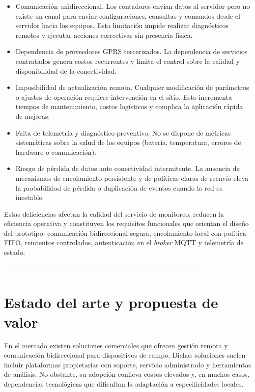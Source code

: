 \begin{itemize}
\item  Comunicación unidireccional. Los contadores envían datos al servidor pero no existe un canal para enviar configuraciones, consultas y comandos desde el servidor hacia los equipos. Esta limitación impide realizar diagnósticos remotos y ejecutar acciones correctivas sin presencia física.

\item  Dependencia de proveedores GPRS tercerizados. La dependencia de servicios contratados genera costos recurrentes y limita el control sobre la calidad y disponibilidad de la conectividad.

\item  Imposibilidad de actualización remota. Cualquier modificación de parámetros o ajustes de operación requiere intervención en el sitio. Esto incrementa tiempos de mantenimiento, costos logísticos y complica la aplicación rápida de mejoras.

\item  Falta de telemetría y diagnóstico preventivo. No se dispone de métricas sistemáticas sobre la salud de los equipos (batería, temperatura, errores de hardware o comunicación).

\item Riesgo de pérdida de datos ante conectividad intermitente. La ausencia de mecanismos de encolamiento persistente y de políticas claras de reenvío eleva la probabilidad de pérdida o duplicación de eventos cuando la red es inestable.

\end{itemize}

Estas deficiencias afectan la calidad del servicio de monitoreo, reducen la eficiencia operativa y constituyen los requisitos funcionales que orientan el diseño del prototipo: comunicación bidireccional segura, encolamiento local con política FIFO, reintentos controlados, autenticación en el \textit{broker} MQTT y telemetría de estado.


--------------------------------------------------------------------------------------
\newpage

\section{Estado del arte y propuesta de valor}

En el mercado existen soluciones comerciales que ofrecen gestión remota y comunicación bidireccional para dispositivos de campo. Dichas soluciones suelen incluir plataformas propietarias con soporte, servicio administrado y herramientas de análisis. No obstante, su adopción conlleva costos elevados y, en muchos casos, dependencias tecnológicas que dificultan la adaptación a especificidades locales.

